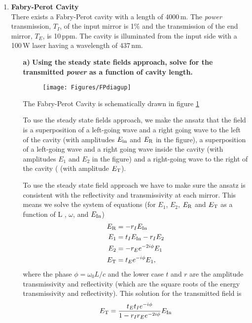 \documentclass[11pt]{article}
\begin{document}
%



\medskip

\begin{enumerate}

\item
{\bf Fabry-Perot Cavity} \\
There exists a Fabry-Perot cavity with a length of 4000\,m. The \emph{power} transmission, $T_I$, of the input mirror is 1\% and the transmission of the end mirror, $T_E$, is 10\,ppm. The cavity is illuminated from the input side with a 100\,W laser having a wavelength of 437\,nm.
\begin{itemize}

\item[\bf a)] {\bf Using the steady state fields approach, solve for the transmitted \emph{power} as a function of cavity length.}

\begin{figure}[t]
\texttt{[image: Figures/FPdiagup]}
\caption{
}
\label{fig:FP}
\end{figure}

The Fabry-Perot Cavity is schematically drawn in figure \ref{fig:FP}

To use the steady state fields approach, we make the ansatz that the field is a superposition of a left-going wave and a right going wave to the left of the cavity (with amplitudes $E_{\rm in}$ and $E_{\rm R}$ in the figure), a superposition of a left-going wave and a right going wave inside the cavity  (with amplitudes $E_{1}$ and $E_{2}$ in the figure) and a right-going wave to the right of the cavity ( (with amplitude $E_{\rm T}$).

To use the steady state field approach we have to make sure the ansatz is consistent with the reflectivity and transmissivity at each mirror. This means we solve the system of equations (for $E_1$, $E_2$, $E_{\rm R}$ and $E_{\rm T}$ as a function of L , $\omega$, and $E_{\rm In}$)
\begin{align}
E_{\rm R}&=-r_I E_{\rm In} \\
E_1&=t_I E_{\rm In}-r_I E_2 \\
E_2& =-r_E e^{-2i\phi}E_1 \\
E_{\rm T}&=t_E e^{-i\phi}E_1,
\end{align}
where the phase $\phi =\omega_0L/c$ and the lower case $t$ and $r$ are the amplitude transmissivity and reflectivity (which are the square roots of the energy transmissivity and reflectivity). 
This solution for the transmitted field is 
\begin{align}
E_{\rm T}=\frac{t_Et_I e^{-i\phi}}{1-r_Ir_E e^{-2i\phi}}E_{\rm In}
\end{align}


\end{itemize}
\end{enumerate}
\end{document}
